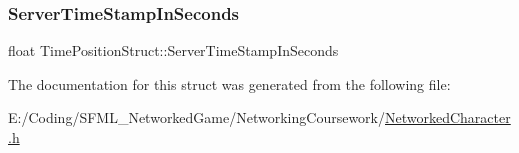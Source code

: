 \subsubsection{\texorpdfstring{Server\+Time\+Stamp\+In\+Seconds}{ServerTimeStampInSeconds}}
{\footnotesize\ttfamily float Time\+Position\+Struct\+::\+Server\+Time\+Stamp\+In\+Seconds}



The documentation for this struct was generated from the following file\+:\begin{DoxyCompactItemize}
\item 
E\+:/\+Coding/\+S\+F\+M\+L\+\_\+\+Networked\+Game/\+Networking\+Coursework/\hyperlink{_networked_character_8h}{Networked\+Character.\+h}\end{DoxyCompactItemize}
